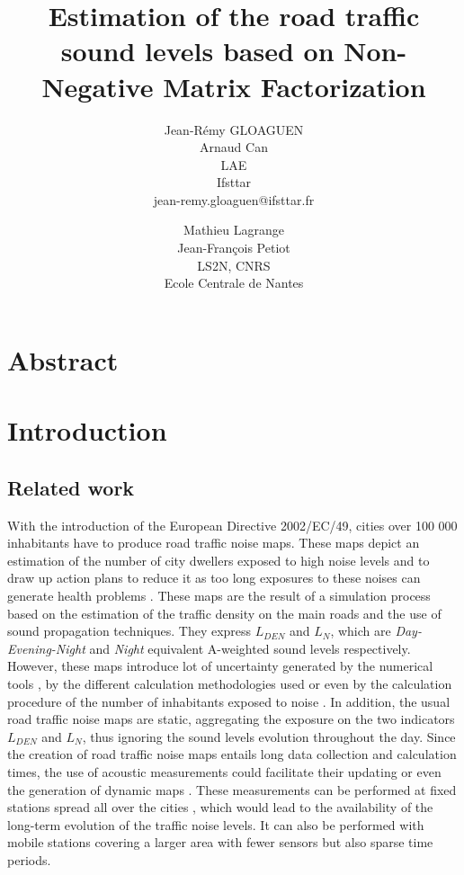 \documentclass[twocolumn,a4paper,10pt]{article}
\title{Estimation of the road traffic sound levels based on Non-Negative Matrix Factorization}
\author{
    Jean-Rémy GLOAGUEN\\
    Arnaud Can\\
    LAE\\
    Ifsttar\\
    jean-remy.gloaguen@ifsttar.fr
  \and
    Mathieu Lagrange\\
	Jean-François Petiot \\
    LS2N, CNRS\\
    Ecole Centrale de  Nantes\\
}
\date{}
\newcommand{\ml}[1]{\textcolor{blue}{ Mathieu: #1}}
\begin{document}
\maketitle

\section*{Abstract}

\section{Introduction}
\subsection{Related work}
With the introduction of the European Directive 2002/EC/49, cities over 100 000 inhabitants have to produce road traffic noise maps. These maps depict an estimation of the number of city dwellers exposed to high noise levels and to draw up action plans to reduce it as too long exposures to these noises can generate health problems \cite{who_burden_2017}. These maps are the result of a simulation process based on the estimation of the traffic density on the main roads and the use of sound propagation techniques. They express $L_ {DEN}$ and $L_N$, which are \textit{Day-Evening-Night} and \textit{Night} equivalent A-weighted sound levels respectively. However, these maps introduce lot of uncertainty generated by the numerical tools \cite{van_leeuwen_noise_2015}, by the different calculation methodologies used \cite{leroy_uncertainty_2010}\cite{garg_critical_2014} or even by the calculation procedure of the number of inhabitants exposed to noise \cite{king_implementation_2011}. In addition, the usual road traffic noise maps are static, aggregating the exposure on the two indicators $L_{DEN}$ and $L_N$, thus ignoring the sound levels evolution throughout the day. Since the creation of road traffic noise maps entails long data collection and calculation times, the use of acoustic measurements could facilitate their updating or even the generation of dynamic maps \cite{wei_dynamic_2016}. These measurements can be performed at fixed stations spread all over the cities \cite{Mioduszewski} \cite{mietlicki2012innovative}, which would lead to the availability of the long-term evolution of the traffic noise levels. It can also be performed with  mobile stations \cite{can_exploring_2012} \cite{manvell2004sadmam} covering a larger area with fewer sensors but also sparse time periods. %
\end{document}
